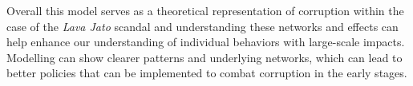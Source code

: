 \documentclass[letterpaper, 11pt]{article}
\begin{document}
Overall this model serves as a theoretical representation of corruption within the case of the \emph{Lava Jato} scandal and understanding these networks and effects can help enhance our understanding of individual behaviors with large-scale impacts. Modelling can show clearer patterns and underlying networks, which can lead to better policies that can be implemented to combat corruption in the early stages.


 
\end{document}
